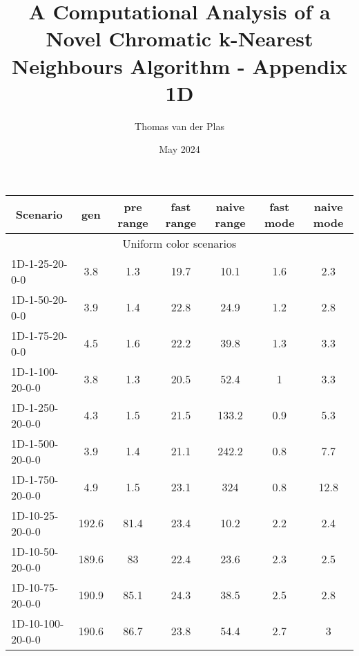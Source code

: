 \documentclass{article}
\title{A Computational Analysis of a Novel Chromatic k-Nearest Neighbours Algorithm - Appendix 1D}
\author{Thomas van der Plas}
\date{May 2024}
\begin{document}
\maketitle
{}
    \begin{table}[h]
        \hskip0.8cm
        
        \begin{center}
        \begin{tabular}{|l||c|c|c|c|c|c|}
            \hline
            \multicolumn{1}{|c|}{Scenario} & gen     & pre range & fast range & naive range & fast mode & naive mode \\
            \hline
            \hline
            \multicolumn{7}{|c|}{Uniform color scenarios}                                                             \\
            \hline
            1D-1-25-20-0-0                       & 3.8     & 1.3        & 19.7       & 10.1        & 1.6       & 2.3        \\
            1D-1-50-20-0-0                       & 3.9     & 1.4        & 22.8       & 24.9        & 1.2       & 2.8        \\
            1D-1-75-20-0-0                       & 4.5     & 1.6        & 22.2       & 39.8        & 1.3       & 3.3        \\
            1D-1-100-20-0-0                      & 3.8     & 1.3        & 20.5       & 52.4        & 1         & 3.3        \\
            1D-1-250-20-0-0                      & 4.3     & 1.5        & 21.5       & 133.2       & 0.9       & 5.3        \\
            1D-1-500-20-0-0                      & 3.9     & 1.4        & 21.1       & 242.2       & 0.8       & 7.7        \\
            1D-1-750-20-0-0                      & 4.9     & 1.5        & 23.1       & 324         & 0.8       & 12.8       \\
            \hline
            1D-10-25-20-0-0                       & 192.6   & 81.4       & 23.4       & 10.2        & 2.2       & 2.4        \\
            1D-10-50-20-0-0                       & 189.6   & 83         & 22.4       & 23.6        & 2.3       & 2.5        \\
            1D-10-75-20-0-0                       & 190.9   & 85.1       & 24.3       & 38.5        & 2.5       & 2.8        \\
            1D-10-100-20-0-0                      & 190.6   & 86.7       & 23.8       & 54.4        & 2.7       & 3          \\

\end{tabular}
\end{center}
\end{table}
\end{document}
